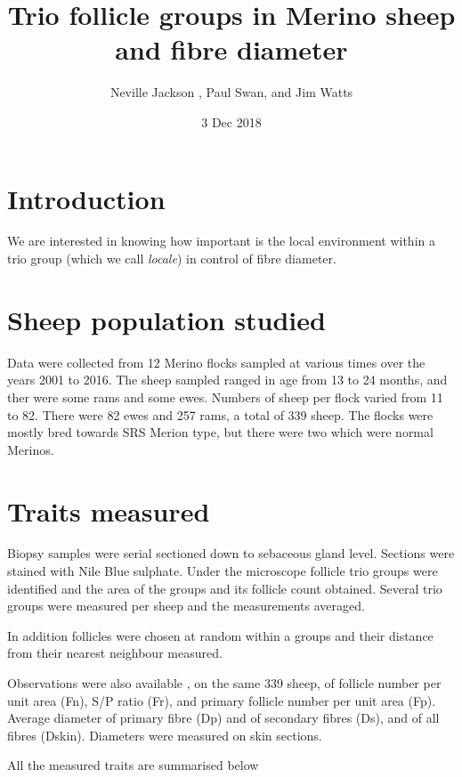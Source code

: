 \documentclass[titlepage]{article}  %
\title{ Trio follicle  groups in Merino sheep and fibre diameter}
\author{Neville Jackson , Paul Swan, and Jim Watts}
\date{3 Dec 2018}
\begin{document}
 
 
\maketitle      
\tableofcontents


\clearpage
\section{Introduction} 
We are interested in knowing how important is the local environment within a trio group (which we call {\em locale}) in control of fibre diameter. 


\section{ Sheep population studied}
 Data were collected from 12 Merino flocks sampled at various times over the years 2001 to 2016. The sheep sampled ranged in age from 13 to 24 months, and ther were some rams and some ewes. Numbers of sheep per flock varied from 11 to 82. There were 82 ewes and 257 rams, a total of 339 sheep.
 The flocks were mostly bred towards SRS Merion type, but there were two which were normal Merinos.


\section{Traits measured}
Biopsy samples were serial sectioned down to sebaceous gland level. Sections were stained with Nile Blue sulphate. Under the microscope follicle trio groups were identified and the area of the groups and its follicle count obtained. Several trio groups were measured per sheep and the measurements averaged.

In addition follicles were chosen at random within a groups and their distance from their nearest neighbour measured.

Observations were also available , on the same 339 sheep, of follicle number per unit area (Fn), S/P ratio (Fr), and primary follicle number per unit area (Fp). Average diameter of primary fibre (Dp) and of secondary fibres (Ds), and of all fibres (Dskin). Diameters were measured on skin sections.

All the measured traits are summarised below
\end{document}
